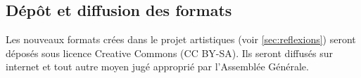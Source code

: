 \documentclass[a4paper,french,10pt]{article}
\begin{document}




\subsection{Dépôt et diffusion des formats}
\label{sec:depot-et-diffusion}
Les nouveaux formats crées dans le projet artistiques (voir
\ref{sec:reflexions}) seront déposés sous licence Creative Commons (CC
BY-SA). Ils seront diffusés sur internet et tout autre moyen jugé approprié par l'Assemblée Générale.



\end{document}
